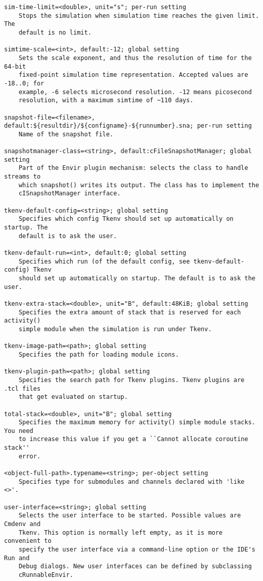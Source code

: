 \begin{verbatim}
sim-time-limit=<double>, unit="s"; per-run setting
    Stops the simulation when simulation time reaches the given limit. The
    default is no limit.

simtime-scale=<int>, default:-12; global setting
    Sets the scale exponent, and thus the resolution of time for the 64-bit
    fixed-point simulation time representation. Accepted values are -18..0; for
    example, -6 selects microsecond resolution. -12 means picosecond
    resolution, with a maximum simtime of ~110 days.

snapshot-file=<filename>, default:${resultdir}/${configname}-${runnumber}.sna; per-run setting
    Name of the snapshot file.

snapshotmanager-class=<string>, default:cFileSnapshotManager; global setting
    Part of the Envir plugin mechanism: selects the class to handle streams to
    which snapshot() writes its output. The class has to implement the
    cISnapshotManager interface.

tkenv-default-config=<string>; global setting
    Specifies which config Tkenv should set up automatically on startup. The
    default is to ask the user.

tkenv-default-run=<int>, default:0; global setting
    Specifies which run (of the default config, see tkenv-default-config) Tkenv
    should set up automatically on startup. The default is to ask the user.

tkenv-extra-stack=<double>, unit="B", default:48KiB; global setting
    Specifies the extra amount of stack that is reserved for each activity()
    simple module when the simulation is run under Tkenv.

tkenv-image-path=<path>; global setting
    Specifies the path for loading module icons.

tkenv-plugin-path=<path>; global setting
    Specifies the search path for Tkenv plugins. Tkenv plugins are .tcl files
    that get evaluated on startup.

total-stack=<double>, unit="B"; global setting
    Specifies the maximum memory for activity() simple module stacks. You need
    to increase this value if you get a ``Cannot allocate coroutine stack''
    error.

<object-full-path>.typename=<string>; per-object setting
    Specifies type for submodules and channels declared with 'like <>'.

user-interface=<string>; global setting
    Selects the user interface to be started. Possible values are Cmdenv and
    Tkenv. This option is normally left empty, as it is more convenient to
    specify the user interface via a command-line option or the IDE's Run and
    Debug dialogs. New user interfaces can be defined by subclassing
    cRunnableEnvir.


\end{verbatim}
